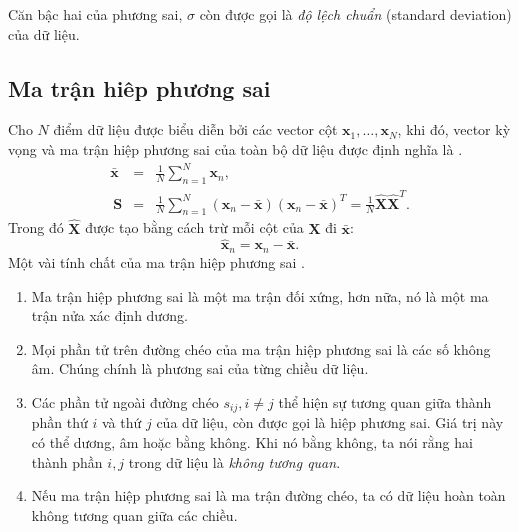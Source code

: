 Căn bậc hai của phương sai, $\sigma$ còn được gọi là \textit{độ lệch chuẩn} (standard deviation) của
dữ liệu.
\subsection{Ma trận hiêp phương sai}

Cho $N$ điểm dữ liệu được biểu diễn bởi các vector cột $\mathbf{x}_1, \dots, \mathbf{x}_N$, khi đó, {vector kỳ vọng} và {ma trận hiệp phương sai} của toàn bộ dữ liệu được định nghĩa là \cite{V1}.
\begin{eqnarray}
\bar{\mathbf{x}} &=& \frac{1}{N} \sum_{n=1}^N \mathbf{x}_n, \\\
\mathbf{S} &=&  \frac{1}{N}\sum_{n=1}^N (\mathbf{x}_n - \bar{\mathbf{x}})(\mathbf{x}_n - \bar{\mathbf{x}})^T = \frac{1}{N}\hat{\mathbf{X}}\hat{\mathbf{X}}^T.
\end{eqnarray}
Trong đó $\hat{\mathbf{X}}$ được tạo bằng cách trừ mỗi cột của $\mathbf{X}$ đi $\bar{\mathbf{x}}$:
\begin{equation}
\hat{\mathbf{x}}_n = \mathbf{x}_n - \bar{\mathbf{x}}.
\end{equation}
Một vài tính chất của ma trận hiệp phương sai \cite{V1}.

\begin{enumerate}
	
	\item Ma trận hiệp phương sai là một ma trận đối xứng, hơn nữa, nó là một ma trận nửa xác định dương.
	
	\item Mọi phần tử trên đường chéo của ma trận hiệp phương sai là các số không âm. Chúng chính là phương sai của từng chiều dữ liệu.
	
	\item Các phần tử ngoài đường chéo $s_{ij}, i \neq j$ thể hiện sự tương quan
	giữa thành phần thứ $i$ và thứ $j$ của dữ liệu, còn được gọi là hiệp phương
	sai. Giá trị này có thể dương, âm hoặc bằng không. Khi nó bằng không, ta nói
	rằng hai thành phần $i, j$ trong dữ liệu là \textit{không tương quan}.
	
	\item Nếu ma trận hiệp phương sai là ma trận đường chéo, ta có dữ liệu hoàn toàn không tương quan giữa các chiều.
\end{enumerate}

